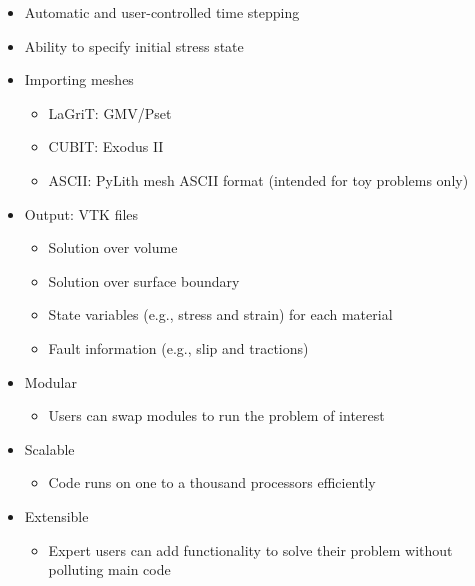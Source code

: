 \documentclass[pdftex,cig,slideColor]{pp4slides}
\begin{document}
  \summary{}

  \begin{itemize}
  \item Automatic and user-controlled time stepping
  \item Ability to specify initial stress state
  \item Importing meshes
    \begin{itemize}
    \item LaGriT: GMV/Pset
    \item CUBIT: Exodus II
    \item ASCII: PyLith mesh ASCII format (intended for toy problems only)
    \end{itemize}
  \item Output: VTK files
    \begin{itemize}
    \item Solution over volume
    \item Solution over surface boundary
    \item State variables (e.g., stress and strain) for each material
    \item Fault information (e.g., slip and tractions)
    \end{itemize}
  \end{itemize}

  
  \begin{itemize}
  \item Modular
    \begin{itemize}
    \item Users can swap modules to run the problem of interest
    \end{itemize}
  \item Scalable
    \begin{itemize}
    \item Code runs on one to a thousand processors efficiently
    \end{itemize}    
  \item Extensible
    \begin{itemize}
    \item Expert users can add functionality to solve their problem
      without polluting main code
    \end{itemize}
  \end{itemize}
\end{document}
